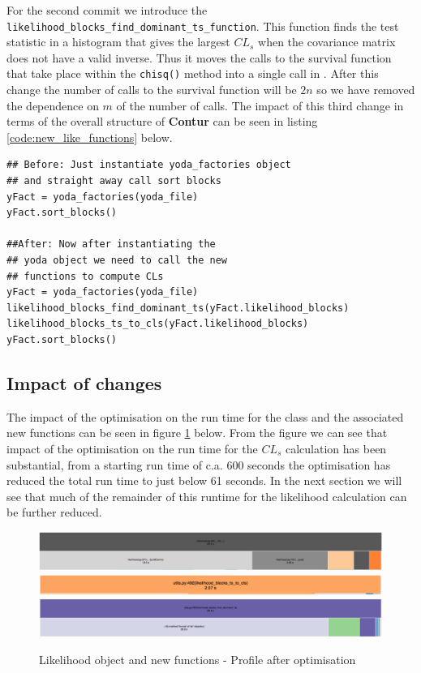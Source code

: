 For the second commit we introduce the \texttt{likelihood\_blocks\_find\_dominant\_ts\_function}. This function finds the test statistic in a histogram that gives the largest $CL_s$ when the covariance matrix does not have a valid inverse. Thus it moves the calls to the survival function that take place within the \texttt{chisq()} method into a single call in . After this change the number of calls to the survival function will be $2n$ so we have removed the dependence on $m$ of the number of calls. The impact of this third change in terms of the overall structure of \textbf{Contur} can be seen in listing \ref{code:new_like_functions} below.
\begin{code}
\label{code:new_like_functions}
\begin{verbatim}
## Before: Just instantiate yoda_factories object
## and straight away call sort blocks
yFact = yoda_factories(yoda_file)
yFact.sort_blocks()

##After: Now after instantiating the 
## yoda object we need to call the new 
## functions to compute CLs
yFact = yoda_factories(yoda_file)
likelihood_blocks_find_dominant_ts(yFact.likelihood_blocks)
likelihood_blocks_ts_to_cls(yFact.likelihood_blocks)
yFact.sort_blocks()

\end{verbatim}
\end{code}

\subsection{Impact of changes}

The impact of the optimisation on the run time for the  class and the associated new functions can be seen in figure \ref{fig:like_last_profile} below. From the figure we can see that impact of the optimisation on the run time for the $CL_s$ calculation has been substantial, from a starting run time of c.a. $600$ seconds the optimisation has reduced the total run time to just below 61 seconds. In the next section we will see that much of the remainder of this runtime for the likelihood calculation can be further reduced.
\begin{figure}[H]
\centering
\includegraphics[scale=0.3]{plots/like_after_change_before.png}
\includegraphics[scale=0.3]{plots/like_ts_to_cls.png}
\includegraphics[scale=0.3]{plots/find_dominant_ts_before.png}
\caption{Likelihood object and new functions - Profile after optimisation}
\label{fig:like_last_profile}
\end{figure}

